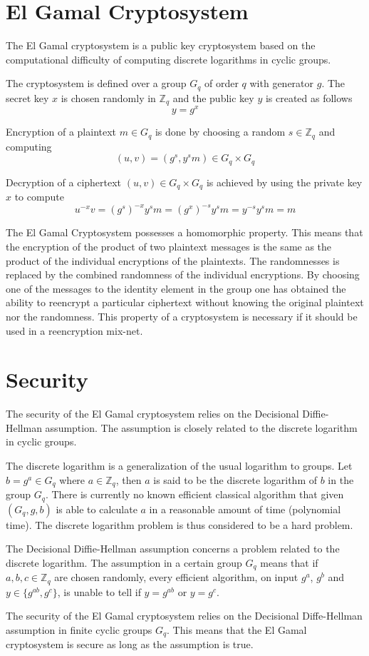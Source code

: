 \documentclass[18pt,a4paper]{article}
\begin{document}
\section*{El Gamal Cryptosystem}
The El Gamal cryptosystem is a public key cryptosystem based on the
computational difficulty of computing discrete logarithms in cyclic
groups. 

The cryptosystem is defined over a group $G_q$ of order $q$ with
generator $g$. The secret key $x$ is chosen randomly in $\mathbb{Z}_q$
and the public key $y$ is created as follows
$$
y = g^x
$$

Encryption of a plaintext $m \in G_q$ is done by choosing a random $s
\in \mathbb{Z}_q$ and computing
$$
(u,v) = (g^s, y^sm) \in G_q \times G_q
$$

Decryption of a ciphertext $(u,v) \in G_q \times G_q$ is achieved by
using the private key $x$ to compute
$$ 
u^{-x}v = (g^s)^{-x}y^sm = (g^x)^{-s}y^sm = y^{-s}y^sm = m
$$

The El Gamal Cryptosystem possesses a homomorphic property. This means
that the encryption of the product of two plaintext messages is the
same as the product of the individual encryptions of the
plaintexts. The randomnesses is replaced by the combined randomness of
the individual encryptions. By choosing one of the messages to the
identity element in the group one has obtained the ability to
reencrypt a particular ciphertext without knowing the original
plaintext nor the randomness. This property of a cryptosystem is
necessary if it should be used in a reencryption mix-net.

\section*{Security}

The security of the El Gamal cryptosystem relies on the Decisional
Diffie-Hellman assumption. The assumption is closely related to the
discrete logarithm in cyclic groups.

The discrete logarithm is a generalization of the usual logarithm to
groups. Let $b = g^a \in G_q$ where $a \in \mathbb{Z}_q$, then $a$ is
said to be the discrete logarithm of $b$ in the group $G_q$. There is
currently no known efficient classical algorithm that given $(G_q, g,
b)$ is able to calculate $a$ in a reasonable amount of time
(polynomial time). The discrete logarithm problem is thus considered
to be a hard problem.

The Decisional Diffie-Hellman assumption concerns a problem related to
the discrete logarithm. The assumption in a certain group $G_q$ means
that if $a,b,c \in \mathbb{Z}_q$ are chosen randomly, every efficient
algorithm, on input $g^a$, $g^b$ and $y \in \{g^{ab}, g^c\}$, is
unable to tell if $y = g^{ab}$ or $y = g^c$.

The security of the El Gamal cryptosystem relies on the Decisional
Diffe-Hellman assumption in finite cyclic groups $G_q$. This means
that the El Gamal cryptosystem is secure as long as the assumption is
true.
\end{document}
